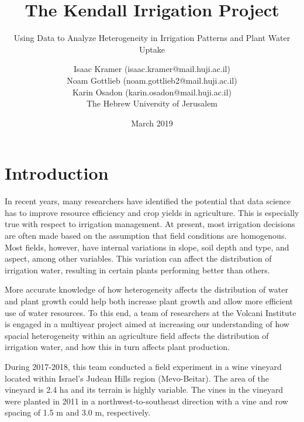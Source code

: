 \documentclass[12pt]{scrartcl}
\begin{document}
\title{The Kendall Irrigation Project}
\subtitle{Using Data to Analyze Heterogeneity in Irrigation Patterns and Plant Water Uptake}
\author{Isaac Kramer (isaac.kramer@mail.huji.ac.il)\\ Noam Gottlieb (noam.gottlieb2@mail.huji.ac.il)\\Karin Osadon (karin.osadon@mail.huji.ac.il) \\
        The Hebrew University of Jerusalem}
\date{March 2019}
\subject{Needle in a Data Haystack\\
Introduction to Data Science (67978) \\}


    \pagestyle{myheadings}


\begin{titlepage}
		\maketitle

\end{titlepage}


\doublespacing
\section{Introduction}
In recent years, many researchers have identified the potential that data science has to improve resource efficiency and crop yields in agriculture. This is especially true with respect to irrigation management. At present, most irrigation decisions are often made based on the assumption that field conditions are homogenous. Most fields, however, have internal variations in slope, soil depth and type, and aspect, among other variables. This variation can affect the distribution of irrigation water, resulting in certain plants performing better than others.

More accurate knowledge of how heterogeneity affects the distribution of water and plant growth could help both increase plant growth and allow more efficient use of water resources. To this end, a team of researchers at the Volcani Institute is engaged in a multiyear project aimed at increasing our understanding of how spacial heterogeneity within an agriculture field affects the distribution of irrigation water, and how this in turn affects plant production.

During 2017-2018, this team conducted a field experiment in a wine vineyard located within Israel's Judean Hills region (Mevo-Beitar). The area of the vineyard is 2.4 ha and its terrain is highly variable. The vines in the vineyard were planted in 2011 in a northwest-to-southeast direction with a vine and row spacing of 1.5 m and 3.0 m, respectively.
\end{document}
